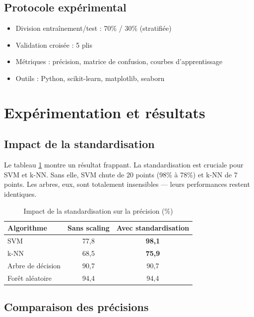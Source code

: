 \documentclass[conference]{IEEEtran}
\begin{document}
\subsection{Protocole expérimental}

\begin{itemize}
    \item Division entraînement/test : 70\% / 30\% (stratifiée)
    \item Validation croisée : 5 plis
    \item Métriques : précision, matrice de confusion, courbes d'apprentissage
    \item Outils : Python, scikit-learn, matplotlib, seaborn
\end{itemize}


\section{Expérimentation et résultats}

\subsection{Impact de la standardisation}

Le tableau \ref{tab:scaling} montre un résultat frappant. La standardisation est cruciale pour SVM et k-NN. Sans elle, SVM chute de 20 points (98\% à 78\%) et k-NN de 7 points. Les arbres, eux, sont totalement insensibles — leurs performances restent identiques.

\begin{table}[!t]
\centering
\caption{Impact de la standardisation sur la précision (\%)}
\begin{tabular}{|l|c|c|}
\hline
\textbf{Algorithme} & \textbf{Sans scaling} & \textbf{Avec standardisation} \\
\hline
SVM & 77,8 & \textbf{98,1} \\
k-NN & 68,5 & \textbf{75,9} \\
Arbre de décision & 90,7 & 90,7 \\
Forêt aléatoire & 94,4 & 94,4 \\
\hline
\end{tabular}
\label{tab:scaling}
\end{table}

\subsection{Comparaison des précisions}
\end{document}
